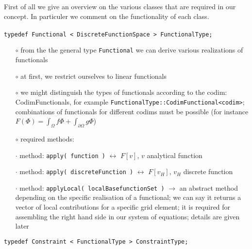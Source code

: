 \documentclass[a4paper,11pt]{article}
\numberwithin{equation}{section}
\begin{document}
First of all we give an overview on the various classes that are required in our concept. In particuler we comment on the functionality of each class.\\
\\
{\tt typedef Functional < DiscreteFunctionSpace > FunctionalType;}
\begin{itemize}
\item[$\circ$] from the the general type {\tt Functional} we can derive various realizations of functionals
\item[$\circ$] at first, we restrict ourselves to linear functionals
\item[$\circ$] we might distinguish the types of functionals according to the codim: CodimFunctionals, for example {\tt FunctionalType::CodimFunctional<codim>}; combinations of functionals for different codims must be possible (for instance $F(\Phi) = \int_{\Omega} f \Phi + \int_{\partial \Omega} g \Phi$)
\item[$\circ$] required methods:
\item[$\cdot$] method: {\tt apply( function )} $\leftrightarrow$ $F[ v ]$, $v$ analytical function 
\item[$\cdot$] method: {\tt apply( discreteFunction )} $\leftrightarrow$ $F[v_H]$, $v_H$ discrete function
\item[$\cdot$] method: {\tt applyLocal( localBasefunctionSet )} $\rightarrow$ an abstract method depending on the specific realisation of a functional; we can say it returns a vector of local contributions for a specific grid element; it is required for assembling the right hand side in our system of equations; details are given later
\end{itemize}
{\tt typedef Constraint < FunctionalType > ConstraintType;}
\end{document}
